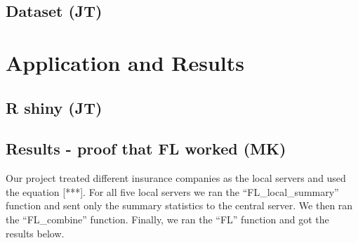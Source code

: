 \documentclass[
]{article}
\begin{document}
\hypertarget{dataset-jt}{%
\subsection{Dataset (JT)}\label{dataset-jt}}

\hypertarget{application-and-results}{%
\section{Application and Results}\label{application-and-results}}

\hypertarget{r-shiny-jt}{%
\subsection{R shiny (JT)}\label{r-shiny-jt}}

\hypertarget{results---proof-that-fl-worked-mk}{%
\subsection{Results - proof that FL worked
(MK)}\label{results---proof-that-fl-worked-mk}}

Our project treated different insurance companies as the local servers
and used the equation {[}***{]}. For all five local servers we ran the
``FL\_local\_summary'' function and sent only the summary statistics to
the central server. We then ran the ``FL\_combine'' function. Finally,
we ran the ``FL'' function and got the results below.
\end{document}

